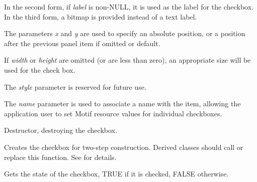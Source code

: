In the second form, if {\it label} is non-NULL, it is used as the label
for the checkbox. In the third form, a bitmap is provided instead of
a text label.

The parameters {\it x} and {\it y} are used to specify an absolute
position, or a position after the previous panel item if omitted or
default.

If {\it width} or {\it height} are omitted (or are less than zero), an
appropriate size will be used for the check box.

The {\it style} parameter is reserved for future use.

The {\it name} parameter is used to associate a name with the item,
allowing the application user to set Motif resource values for
individual checkboxes.



Destructor, destroying the checkbox.




Creates the checkbox for two-step construction. Derived classes
should call or replace this function. See \rtfsp
for details.



Gets the state of the checkbox, TRUE if it is checked, FALSE otherwise.

\label{wxcheckboxsetlabel}


